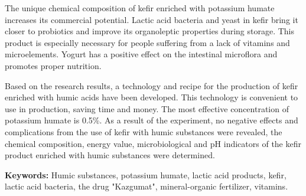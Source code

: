 The unique chemical composition of kefir enriched with potassium humate
increases its commercial potential. Lactic acid bacteria and yeast in
kefir bring it closer to probiotics and improve its organoleptic
properties during storage. This product is especially necessary for
people suffering from a lack of vitamins and microelements. Yogurt has a
positive effect on the intestinal microflora and promotes proper
nutrition.

Based on the research results, a technology and recipe for the
production of kefir enriched with humic acids have been developed. This
technology is convenient to use in production, saving time and money.
The most effective concentration of potassium humate is 0.5\%. As a
result of the experiment, no negative effects and complications from the
use of kefir with humic substances were revealed, the chemical
compo\-sition, energy value, microbiological and pH indicators of the
kefir product enriched with humic substances were determined.

{\bfseries Keywords:} Humic substances, potassium humate, lactic acid
products, kefir, lactic acid bacteria, the drug "Kazgumat",
mineral-organic fertilizer, vitamins.

